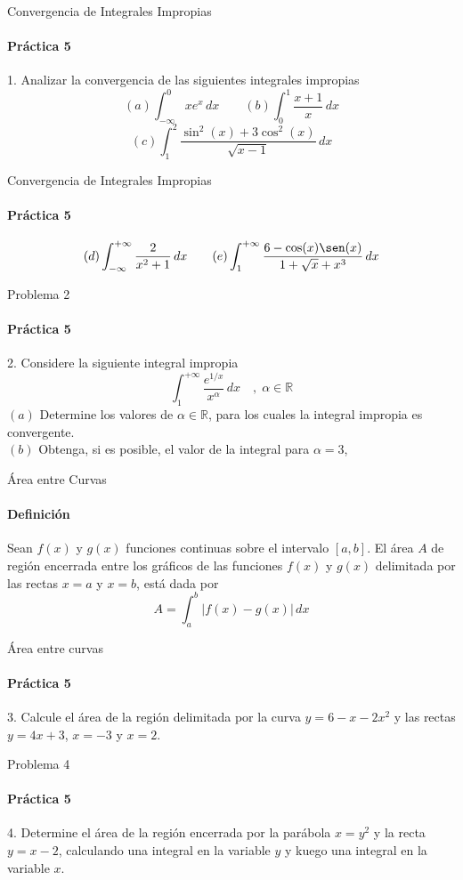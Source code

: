 \documentclass{plantillaPPT}
\begin{document}
\begin{frame}{Convergencia de Integrales Impropias}
\framesubtitle{Práctica 5}

1. Analizar la convergencia de las siguientes integrales impropias
\[(a) \int_{-\infty}^0xe^x\,dx \qquad (b)\int_0^1\frac{x+1}{x}\,dx\]
\vspace{0.5cm}
\[
(c)\int_1^2\frac{\sin^2(x)+3\cos^2(x)}{\sqrt{x-1}}\,dx
\]
\end{frame}

\begin{frame}{Convergencia de Integrales Impropias}
\framesubtitle{Práctica 5}

\[
(d)\int_{-\infty}^{+\infty}\frac{2}{x^2+1}\,dx \qquad (e)\int_1^{+\infty}\frac{6-\cos(x)\sen(x)}{1+\sqrt{x}+x^3}\,dx
\]

\end{frame}

\begin{frame}{Problema 2}
\framesubtitle{Práctica 5}
2. Considere la siguiente integral impropia
\[\int_1^{+\infty}\frac{e^{1/x}}{x^\alpha}\,dx\quad,\; \alpha\in\mathbb{R}\]
\vspace{5pt}
\((a)\) Determine los valores de \(\alpha\in\mathbb{R}\), para los cuales la integral impropia es convergente.\\[3pt]
\((b)\) Obtenga, si es posible, el valor de la integral para \(\alpha=3\),
    
\end{frame}

\begin{frame}{Área entre Curvas}
\framesubtitle{Definición}

\begin{definicion}
    Sean \(f(x)\) y \(g(x)\) funciones continuas sobre el intervalo \([a,b]\). El área \(A\) de región encerrada entre los gráficos de las funciones \(f(x)\) y \(g(x)\) delimitada por las rectas \(x=a\) y \(x=b\), está dada por
    \[
        A = \int_a^b |f(x)-g(x)|\,dx
    \]
\end{definicion}
    
\end{frame}

\begin{frame}{Área entre curvas}
\framesubtitle{Práctica 5}

3. Calcule el área de la región delimitada por la curva \(y=6-x-2x^2\) y las rectas \(y=4x+3\), \(x=-3\) y \(x=2\).
    
\end{frame}

\begin{frame}{Problema 4}
\framesubtitle{Práctica 5}

4. Determine el área de la región encerrada por la parábola \(x=y^2\) y la recta \(y=x-2\), calculando una integral en la variable \(y\) y kuego una integral en la variable \(x\).
    
\end{frame}
\end{document}
